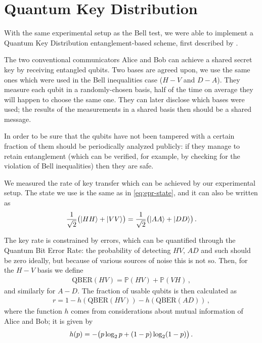 \documentclass[main.tex]{subfiles}
\begin{document}
\section{Quantum Key Distribution}

With the same experimental setup as the Bell test, we were able to implement a Quantum Key Distribution entanglement-based scheme, first described by \textcite{bennettQuantumCryptographyBell1992}. 

The two conventional communicators Alice and Bob can achieve a shared secret key by receiving entangled qubits. 
Two bases are agreed upon, we use the same ones which were used in the Bell inequalities case (\(H-V\) and \(D-A\)).
They measure each qubit in a randomly-chosen basis, half of the time on average they will happen to choose the same one.
They can later disclose which bases were used; the results of the measurements in a shared basis then should be a shared message. 

In order to be sure that the qubits have not been tampered with a certain fraction of them should be periodically analyzed publicly: if they manage to retain entanglement (which can be verified, for example, by checking for the violation of Bell inequalities) then they are safe. 

We measured the rate of key transfer which can be achieved by our experimental setup. 
The state we use is the same as in \eqref{eq:epr-state}, and it can also be written as 
%
\begin{align}
\frac{1}{\sqrt{2}} \qty(\ket{HH} + \ket{VV})
=
\frac{1}{\sqrt{2}} \qty(\ket{AA} + \ket{DD})
\,.
\end{align}

The key rate is constrained by errors, which can be quantified through the Quantum Bit Error Rate: the probability of detecting \(HV\), \(AD\) and such should be zero ideally, but because of various sources of noise this is not so.
Then, for the \(H-V\) basis we define 
%
\begin{align}
\text{QBER}(HV) = \mathbb{P}(HV)+ \mathbb{P}(VH)
\,,
\end{align}
%
and similarly for \(A-D\). 
The fraction of usable qubits is then calculated as 
%
\begin{align}
r = 
1
- h (\text{QBER}(HV))
- h (\text{QBER}(AD))
\,,
\end{align}
%
where the function \(h\) comes from considerations about mutual information of Alice and Bob; it is given by 
%
\begin{align}
h (p) = - \qty(p \log_2 p + (1-p) \log_2 (1-p) )
\,.
\end{align}
\end{document}
